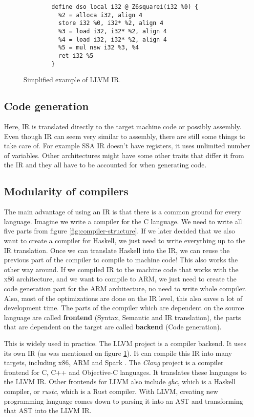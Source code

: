 \begin{figure}\label{fig:llvm-ir-example}
    \begin{verbatim}
        define dso_local i32 @_Z6squarei(i32 %0) {
          %2 = alloca i32, align 4
          store i32 %0, i32* %2, align 4
          %3 = load i32, i32* %2, align 4
          %4 = load i32, i32* %2, align 4
          %5 = mul nsw i32 %3, %4
          ret i32 %5
        }
    \end{verbatim}
    \caption{Simplified example of LLVM IR.}
\end{figure}

\subsection{Code generation}
Here, IR is translated directly to the target machine code or possibly assembly. Even though IR can seem very similar to assembly,
there are still some things to take care of. For example SSA IR doesn't have registers, it uses unlimited number of variables.
Other architectures might have some other traits that differ it from the IR and they all have to be accounted for when generating code.

\subsection{Modularity of compilers}
The main advantage of using an IR is that there is a common ground for every language. Imagine we write a compiler for the C language.
We need to write all five parts from figure \ref{fig:compiler-structure}. If we later decided that we also want to create a compiler
for Haskell, we just need to write everything up to the IR translation. Once we can translate Haskell into the IR, we can reuse the
previous part of the compiler to compile to machine code! This also works the other way around. If we compiled IR to the machine code
that works with the x86 architecture, and we want to compile to ARM, we just need to create the code generation part for the ARM architecture,
no need to write whole compiler. Also, most of the optimizations are done on the IR level, this also saves a lot of development time.
The parts of the compiler which are dependent on the source language are called \textbf{frontend} (Syntax, Semantic and IR translation), the parts that are dependent on
the target are called \textbf{backend} (Code generation).

This is widely used in practice. The LLVM \cite{llvm} project is a compiler backend. It uses its own IR (as was mentioned on figure \ref{fig:llvm-ir-example}).
It can compile this IR into many targets, including x86, ARM and Spark . The \textit{Clang} project is a compiler frontend for C, C++ and Objective-C languages.
It translates these languages to the LLVM IR. Other frontends for LLVM also include \textit{ghc}, which is a Haskell compiler, or \textit{rustc}, which is a Rust compiler.
With LLVM, creating new programming language comes down to parsing it into an AST and transforming that AST into the LLVM IR.


